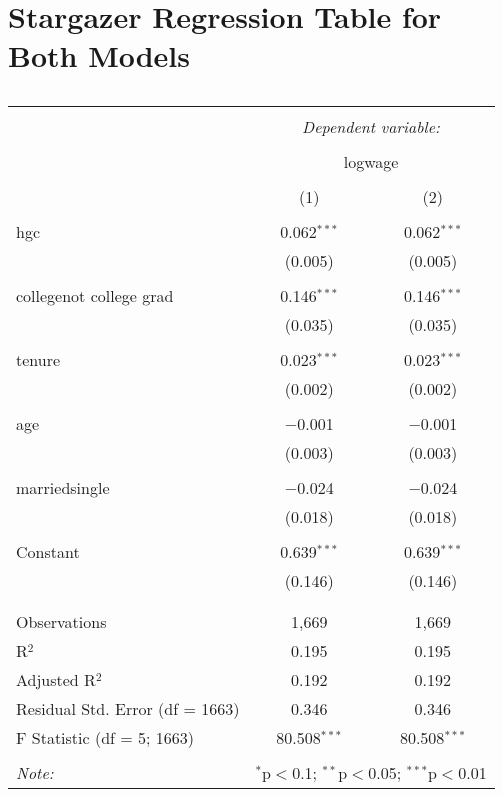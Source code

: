 \documentclass{article}
\begin{document}
\section{Stargazer Regression Table for Both Models}
\begin{table}[!htbp] \centering
  \caption{}
  \label{}
\begin{tabular}{@{\extracolsep{5pt}}lcc}
\\[-1.8ex]\hline
\hline \\[-1.8ex]
 & \multicolumn{2}{c}{\textit{Dependent variable:}} \\
\cline{2-3}
\\[-1.8ex] & \multicolumn{2}{c}{logwage} \\
\\[-1.8ex] & (1) & (2)\\
\hline \\[-1.8ex]
 hgc & 0.062$^{***}$ & 0.062$^{***}$ \\
  & (0.005) & (0.005) \\
  & & \\
 collegenot college grad & 0.146$^{***}$ & 0.146$^{***}$ \\
  & (0.035) & (0.035) \\
  & & \\
 tenure & 0.023$^{***}$ & 0.023$^{***}$ \\
  & (0.002) & (0.002) \\
  & & \\
 age & $-$0.001 & $-$0.001 \\
  & (0.003) & (0.003) \\
  & & \\
 marriedsingle & $-$0.024 & $-$0.024 \\
  & (0.018) & (0.018) \\
  & & \\
 Constant & 0.639$^{***}$ & 0.639$^{***}$ \\
  & (0.146) & (0.146) \\
  & & \\
\hline \\[-1.8ex]
Observations & 1,669 & 1,669 \\
R$^{2}$ & 0.195 & 0.195 \\
Adjusted R$^{2}$ & 0.192 & 0.192 \\
Residual Std. Error (df = 1663) & 0.346 & 0.346 \\
F Statistic (df = 5; 1663) & 80.508$^{***}$ & 80.508$^{***}$ \\
\hline
\hline \\[-1.8ex]
\textit{Note:}  & \multicolumn{2}{r}{$^{*}$p$<$0.1; $^{**}$p$<$0.05; $^{***}$p$<$0.01} \\
\end{tabular}
\end{table}
\pagebreak
\end{document}
